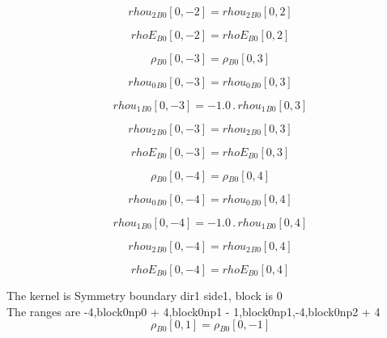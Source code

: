 \documentclass{article}
\begin{document}
\begin{dmath}{rhou_{2}{_{B0}}}[{0,-2}] = {rhou_{2}{_{B0}}}[{0,2}]\end{dmath}

\begin{dmath}{rhoE{_{B0}}}[{0,-2}] = {rhoE{_{B0}}}[{0,2}]\end{dmath}

\begin{dmath}{\rho{_{B0}}}[{0,-3}] = {\rho{_{B0}}}[{0,3}]\end{dmath}

\begin{dmath}{rhou_{0}{_{B0}}}[{0,-3}] = {rhou_{0}{_{B0}}}[{0,3}]\end{dmath}

\begin{dmath}{rhou_{1}{_{B0}}}[{0,-3}] = - 1.0 \,.\, {rhou_{1}{_{B0}}}[{0,3}]\end{dmath}

\begin{dmath}{rhou_{2}{_{B0}}}[{0,-3}] = {rhou_{2}{_{B0}}}[{0,3}]\end{dmath}

\begin{dmath}{rhoE{_{B0}}}[{0,-3}] = {rhoE{_{B0}}}[{0,3}]\end{dmath}

\begin{dmath}{\rho{_{B0}}}[{0,-4}] = {\rho{_{B0}}}[{0,4}]\end{dmath}

\begin{dmath}{rhou_{0}{_{B0}}}[{0,-4}] = {rhou_{0}{_{B0}}}[{0,4}]\end{dmath}

\begin{dmath}{rhou_{1}{_{B0}}}[{0,-4}] = - 1.0 \,.\, {rhou_{1}{_{B0}}}[{0,4}]\end{dmath}

\begin{dmath}{rhou_{2}{_{B0}}}[{0,-4}] = {rhou_{2}{_{B0}}}[{0,4}]\end{dmath}

\begin{dmath}{rhoE{_{B0}}}[{0,-4}] = {rhoE{_{B0}}}[{0,4}]\end{dmath}

\noindent The kernel is Symmetry boundary dir1 side1, block is 0\\\noindent The ranges are -4,block0np0 + 4,block0np1 - 1,block0np1,-4,block0np2 + 4\\\begin{dmath}{\rho{_{B0}}}[{0,1}] = {\rho{_{B0}}}[{0,-1}]\end{dmath}
\end{document}
